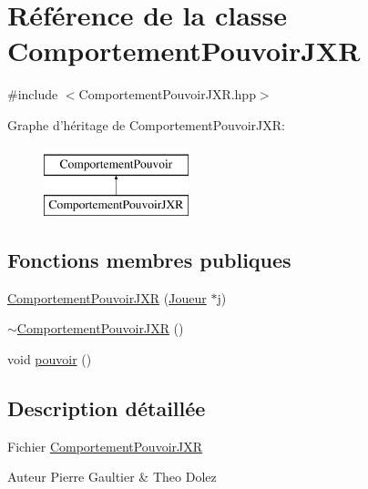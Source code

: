 \hypertarget{class_comportement_pouvoir_j_x_r}{\section{\-Référence de la classe \-Comportement\-Pouvoir\-J\-X\-R}
\label{class_comportement_pouvoir_j_x_r}
}


{\ttfamily \#include $<$\-Comportement\-Pouvoir\-J\-X\-R.\-hpp$>$}

\-Graphe d'héritage de \-Comportement\-Pouvoir\-J\-X\-R\-:\begin{figure}[H]
\begin{center}
\leavevmode
\includegraphics[height=2.000000cm]{class_comportement_pouvoir_j_x_r}
\end{center}
\end{figure}
\subsection*{\-Fonctions membres publiques}
\begin{DoxyCompactItemize}
\item 
\hyperlink{class_comportement_pouvoir_j_x_r_a6bfa37111b1d6add5cabd1c5a433291b}{\-Comportement\-Pouvoir\-J\-X\-R} (\hyperlink{class_joueur}{\-Joueur} $\ast$j)
\item 
\hyperlink{class_comportement_pouvoir_j_x_r_a60e6ba18e25818261a5c11bd6780db10}{$\sim$\-Comportement\-Pouvoir\-J\-X\-R} ()
\item 
void \hyperlink{class_comportement_pouvoir_j_x_r_a3d40cb49543bd69accaa1ddfb09aa9cc}{pouvoir} ()
\end{DoxyCompactItemize}


\subsection{\-Description détaillée}
\-Fichier \hyperlink{class_comportement_pouvoir_j_x_r}{\-Comportement\-Pouvoir\-J\-X\-R} \begin{DoxyAuthor}{\-Auteur}
\-Pierre \-Gaultier \& \-Theo \-Dolez 
\end{DoxyAuthor}


